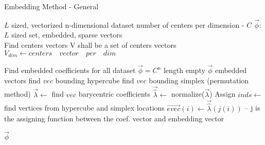 \begin{algorithm}
	\caption{Embedding Method - General}
	\begin{algorithmic}
	
		\REQUIRE $L$ sized, vectorized n-dimensional dataset
		\REQUIRE number of centers per dimension - $C$
		\ENSURE $\overrightarrow{\phi}$: $L$ sized set, embedded, sparse vectors\\
		
		\STATE Find centers vectors
		\STATE V shall be a set of centers vectors
		\STATE $V_{dim} \leftarrow centers \quad vector \quad per \quad dim$
		\ENDFOR
		
		\STATE Find embedded coefficients for all dataset
		\STATE $\overrightarrow{\phi} = C^n$ length empty $\overrightarrow{\phi}$ embedded vectors
		\STATE find $vec$ bounding hypercube 
		\STATE find $vec$ bounding simplex (permutation method)
		\STATE $\overrightarrow{\lambda} \leftarrow$ find $vec$ barycentric coefficients 
		\STATE $\overrightarrow{\hat{\lambda}} \leftarrow$ normalize($\overrightarrow{\lambda}$)
		\ENDFOR
		\STATE Assign
		\STATE $inds \leftarrow$ find vertices from hypercube and simplex locations
		\STATE $\overrightarrow{evec}(i) \leftarrow \overrightarrow{\hat{\lambda}}(j(i))$ -- j is the assigning function between the coef. vector and embedding vector
		\ENDFOR
		\ENDFOR
		
		\RETURN $\overrightarrow{\phi}$
	
	\end{algorithmic}
\end{algorithm}